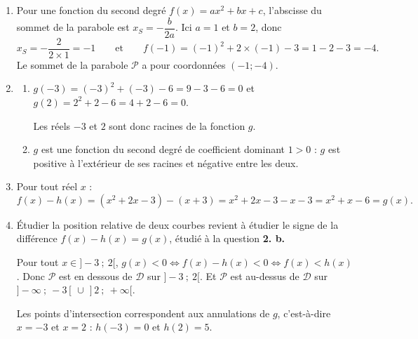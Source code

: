 \begin{enumerate}
	\item Pour une fonction du second degré $f(x) = ax^2+bx+c$, l'abscisse du sommet de la parabole
	est $x_S = -\dfrac{b}{2a}$. Ici $a = 1$ et $b = 2$, donc
	\[x_S = -\dfrac{2}{2 \times 1} = -1 \qquad\text{et}\qquad f(-1) = (-1)^2 + 2\times(-1) - 3 = 1 - 2 - 3 = -4.\]
	Le sommet de la parabole $\mathcal{P}$ a pour coordonnées $(-1 ; -4)$.

	\item
	\begin{enumerate}
		\item $g(-3) = (-3)^2 + (-3) - 6 = 9 - 3 - 6 = 0$ \quad et \quad $g(2) = 2^2 + 2 - 6 = 4 + 2 - 6 = 0$.

		Les réels $-3$ et $2$ sont donc racines de la fonction $g$.

		\item $g$ est une fonction du second degré de coefficient dominant $1 > 0$ : $g$ est positive à l'extérieur de ses racines et négative entre les
		deux.

		\begin{center}
		\end{center}
	\end{enumerate}

	\item Pour tout réel $x$ :
	\[f(x) - h(x) = \left(x^2 + 2x - 3\right) - (x+3) = x^2 + 2x - 3 - x - 3 = x^2 + x - 6 = g(x).\]

	\item Étudier la position relative de deux courbes revient à étudier le signe de la différence
	$f(x) - h(x) = g(x)$, étudié à la question \textbf{2. b.}
	
Pour tout $x \in ]-3~;~2[$, $g(x) <0 \iff f(x)-h(x) <0 \iff f(x) < h(x)$.
Donc $\mathcal{P}$ est en dessous de $\mathcal{D}$ sur $]-3~;~2[$.
Et $\mathcal{P}$ est au-dessus de $\mathcal{D}$ sur $]-\infty~;~-3[ \,\cup\, ]2~;~+\infty[$.

	Les points d'intersection correspondent aux annulations de $g$, c'est-à-dire $x = -3$ et
	$x = 2$ : $h(-3) = 0$ et $h(2) = 5$.


\end{enumerate}
